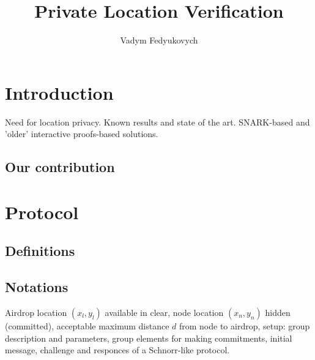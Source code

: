 \documentclass{article}
\begin{document}
\title{Private Location Verification}
\author{Vadym Fedyukovych}
\maketitle


\section{Introduction}

Need for location privacy.
Known results and state of the art.
SNARK-based and 'older' interactive proofs-based solutions.

\subsection{Our contribution}

\section{Protocol}
\subsection{Definitions}


\subsection{Notations}

Airdrop location $(x_l, y_l)$ available in clear, node location $(x_n, y_n)$ hidden (committed),
acceptable maximum distance $d$ from node to airdrop,
setup: group description and parameters, group elements for making commitments,
initial message, challenge and responces of a Schnorr-like protocol.
\end{document}
